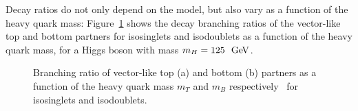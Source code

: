 Decay ratios do not only depend on the model, but also
vary as a function of the heavy quark mass: Figure~\ref{fig:vlqbrs}
shows the decay branching ratios of the vector-like top and
bottom partners for isosinglets and isodoublets as a function
of the heavy quark mass, for a Higgs boson with mass $m_H=125~\gev$.

\begin{figure}
\centering
\caption{Branching ratio of vector-like top (a) and bottom (b) partners as a function of the heavy quark mass $m_T$ and $m_B$ respectively~\cite{ATLAS-CONF-2013-056} for isosinglets and isodoublets.}
\label{fig:vlqbrs}
\end{figure}

